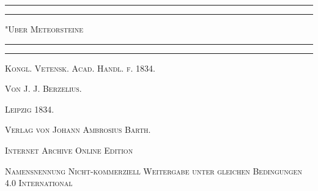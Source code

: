 \documentclass[a4paper, 11pt, oneside]{article}
\begin{document}
\frakfamily
\renewcommand{\contentsname}{
\frakfamily{Inhaltsverzeichnis}
}
\begin{titlepage} %
	\centering %

	
	\rule{\textwidth}{1.6pt}\vspace*{-\baselineskip}\vspace*{2pt} %
	\rule{\textwidth}{0.4pt} %
	
	\vspace{1\baselineskip} %
	
	{\scshape\Huge "Uber Meteorsteine\\[1.25pt]}
	
	\vspace{1\baselineskip} %

	\rule{\textwidth}{0.4pt}\vspace*{-\baselineskip}\vspace{3.2pt} %
	\rule{\textwidth}{1.6pt} %
	
	\vspace{1\baselineskip} %
	
	
	{\Large\scshape Kongl. Vetensk. Acad. Handl. f. 1834.} %
	
	\vspace*{1\baselineskip} %
	
    {\scshape\Large Von J. J. Berzelius.} %
    
    \vspace*{\fill}

	\vspace{1\baselineskip}

	{\Large\scshape Leipzig 1834.}
	
	{\Large\scshape{Verlag von Johann Ambrosius Barth.}}
	
	\vspace{0.5\baselineskip} %

    \scshape\Large Internet Archive Online Edition  %
	
	{\scshape\Large Namensnennung Nicht-kommerziell Weitergabe unter gleichen Bedingungen 4.0 International} %
\end{titlepage}
\setlength{\parskip}{1mm plus1mm minus1mm}
\clearpage
\tableofcontents
\clearpage
\LARGE
\pagestyle{fancy}
\fancyhf{}
\cfoot{\frakfamily{\thepage}}
\end{document}
